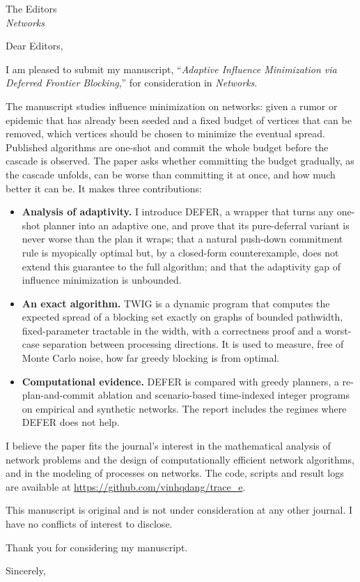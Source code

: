 \documentclass[11pt]{letter}
\begin{document}
\begin{letter}{The Editors \\ \textit{Networks}}

\opening{Dear Editors,}

I am pleased to submit my manuscript, ``\textit{Adaptive Influence Minimization via Deferred Frontier Blocking},'' for consideration in \textit{Networks}.

The manuscript studies influence minimization on networks: given a rumor or epidemic that has already been seeded and a fixed budget of vertices that can be removed, which vertices should be chosen to minimize the eventual spread. Published algorithms are one-shot and commit the whole budget before the cascade is observed. The paper asks whether committing the budget gradually, as the cascade unfolds, can be worse than committing it at once, and how much better it can be. It makes three contributions:

\begin{itemize}
\item \textbf{Analysis of adaptivity.} I introduce DEFER, a wrapper that turns any one-shot planner into an adaptive one, and prove that its pure-deferral variant is never worse than the plan it wraps; that a natural push-down commitment rule is myopically optimal but, by a closed-form counterexample, does not extend this guarantee to the full algorithm; and that the adaptivity gap of influence minimization is unbounded.
\item \textbf{An exact algorithm.} TWIG is a dynamic program that computes the expected spread of a blocking set exactly on graphs of bounded pathwidth, fixed-parameter tractable in the width, with a correctness proof and a worst-case separation between processing directions. It is used to measure, free of Monte Carlo noise, how far greedy blocking is from optimal.
\item \textbf{Computational evidence.} DEFER is compared with greedy planners, a re-plan-and-commit ablation and scenario-based time-indexed integer programs on empirical and synthetic networks. The report includes the regimes where DEFER does not help.
\end{itemize}

I believe the paper fits the journal's interest in the mathematical analysis of network problems and the design of computationally efficient network algorithms, and in the modeling of processes on networks. The code, scripts and result logs are available at \url{https://github.com/vinhqdang/trace_e}.

This manuscript is original and is not under consideration at any other journal. I have no conflicts of interest to disclose.

Thank you for considering my manuscript.

\closing{Sincerely,}

\end{letter}
\end{document}
